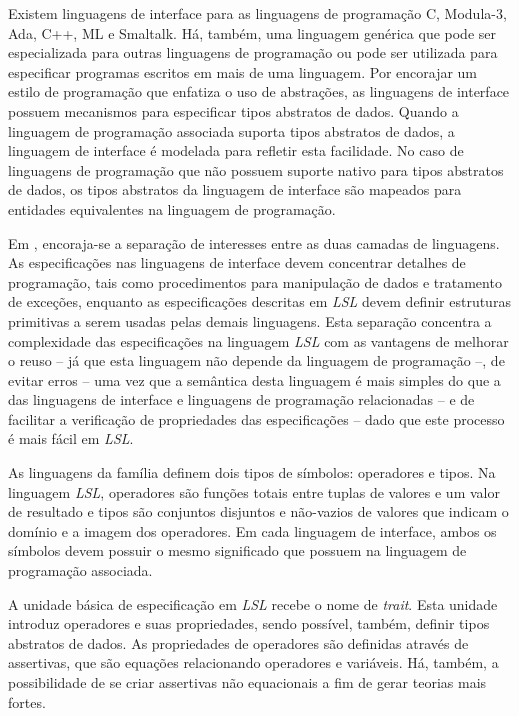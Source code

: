 Existem linguagens de interface para as linguagens de programação C, Modula-3, Ada, C++, ML e Smaltalk.
Há, também, uma linguagem genérica que pode ser especializada para outras linguagens de programação ou pode ser utilizada para especificar programas escritos em mais de uma linguagem.
Por encorajar um estilo de programação que enfatiza o uso de abstrações, as linguagens de interface possuem mecanismos para especificar tipos abstratos de dados.
Quando a linguagem de programação associada suporta tipos abstratos de dados, a linguagem de interface é modelada para refletir esta facilidade.
No caso de linguagens de programação que não possuem suporte nativo para tipos abstratos de dados, os tipos abstratos da linguagem de interface são mapeados para entidades equivalentes na linguagem de programação.

Em \Larch, encoraja-se a separação de interesses entre as duas camadas de linguagens.
As especificações nas linguagens de interface devem concentrar detalhes de programação, tais como procedimentos para manipulação de dados e tratamento de exceções, enquanto as especificações descritas em \textit{LSL} devem definir estruturas primitivas a serem usadas pelas demais linguagens.
Esta separação concentra a complexidade das especificações na linguagem \textit{LSL} com as vantagens de melhorar o reuso -- já que esta linguagem não depende da linguagem de programação --, de evitar erros -- uma vez que a semântica desta linguagem é mais simples do que a das linguagens de interface e linguagens de programação relacionadas -- e de facilitar a verificação de propriedades das especificações -- dado que este processo é mais fácil em \textit{LSL}.

As linguagens da família \Larch definem dois tipos de símbolos: operadores e tipos.
Na linguagem \textit{LSL}, operadores são funções totais entre tuplas de valores e um valor de resultado e tipos são conjuntos disjuntos e não-vazios de valores que indicam o domínio e a imagem dos operadores.
Em cada linguagem de interface, ambos os símbolos devem possuir o mesmo significado que possuem na linguagem de programação associada.

A unidade básica de especificação em \textit{LSL} recebe o nome de \textit{trait}.
Esta unidade introduz operadores e suas propriedades, sendo possível, também, definir tipos abstratos de dados.
As propriedades de operadores são definidas através de assertivas, que são equações relacionando operadores e variáveis.
Há, também, a possibilidade de se criar assertivas não equacionais a fim de gerar teorias mais fortes.

